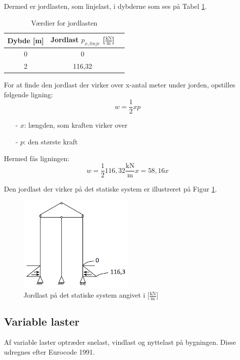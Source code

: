 Dermed er jordlasten, som linjelast, i dybderne som ses på Tabel \ref{tab:jord}.
\begin{table}[htb]
	\begin{center}
		\begin{tabular}{ c c c } 
		\hline
		Dybde [m] & Jordlast $p_{x,linje}$ [$\frac{\text{kN}}{\text{m}}$] \\ \hline
		0 & 0 \\ 
		2 & 116,32
		\end{tabular}
		\caption{Værdier for jordlasten}
		\label{tab:jord}
	\end{center}
\end{table}

For at finde den jordlast der virker over x-antal meter under jorden, opstilles følgende ligning:
\begin{equation}
	w = \frac{1}{2} x p
\end{equation}

\begin{itemize}
	\item[-] $x$: længden, som kraften virker over
	\item[-] $p$: den største kraft
\end{itemize}

Hermed fås ligningen: 
\begin{equation}
	w = \frac{1}{2} 116,\!32 \frac{\text{kN}}{\text{m}} x = 58,\!16x
\end{equation}

Den jordlast der virker på det statiske system er illustreret på Figur \ref{fig:jordlast}.

\begin{figure}[H]
	\centering
	\includegraphics[width=0.5\textwidth]{billeder/jordlast.png}
	\caption{Jordlast på det statiske system angivet i [$\frac{\text{kN}}{\text{m}}$]}
	\label{fig:jordlast}
\end{figure}

\subsection{Variable laster}
Af variable laster optræder snelast, vindlast og nyttelast på bygningen. Disse udregnes efter Eurocode 1991.

